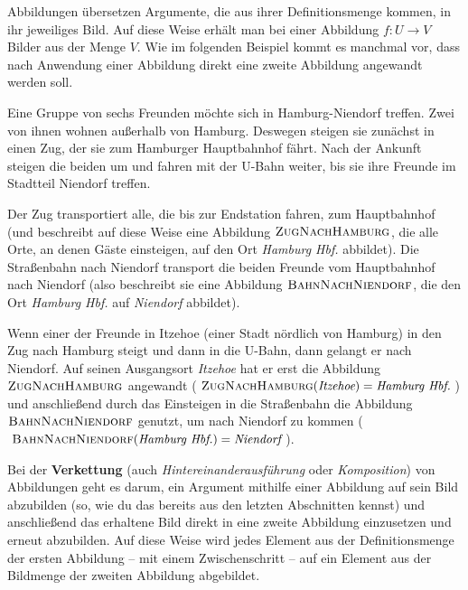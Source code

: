 \documentclass[../../main.tex]{subfiles}
\begin{document}
\label{sec:abbildungen_verkettung}

Abbildungen übersetzen Argumente, die aus ihrer Definitionsmenge kommen, in ihr jeweiliges Bild. Auf diese Weise erhält man bei einer Abbildung $f\colon U\rightarrow V$ Bilder aus der Menge $V$. Wie im folgenden Beispiel kommt es manchmal vor, dass nach Anwendung einer Abbildung direkt eine zweite Abbildung angewandt werden soll.

\begin{example}{}
    Eine Gruppe von sechs Freunden möchte sich in Hamburg-Niendorf treffen. Zwei von ihnen wohnen außerhalb von Hamburg. Deswegen steigen sie zunächst in einen Zug, der sie zum Hamburger Hauptbahnhof fährt. Nach der Ankunft steigen die beiden um und fahren mit der U-Bahn weiter, bis sie ihre Freunde im Stadtteil Niendorf treffen.
    
    Der Zug transportiert alle, die bis zur Endstation fahren, zum Hauptbahnhof (und beschreibt auf diese Weise eine Abbildung $\textsc{ZugNachHamburg}$, die alle Orte, an denen Gäste einsteigen, auf den Ort \emph{Hamburg Hbf.} abbildet). Die Straßenbahn nach Niendorf transport die beiden Freunde vom Hauptbahnhof nach Niendorf (also beschreibt sie eine Abbildung $\textsc{BahnNachNiendorf}$, die den Ort \emph{Hamburg Hbf.} auf \emph{Niendorf} abbildet).
    
    Wenn einer der Freunde in Itzehoe (einer Stadt nördlich von Hamburg) in den Zug nach Hamburg steigt und dann in die U-Bahn, dann gelangt er nach Niendorf. Auf seinen Ausgangsort \emph{Itzehoe} hat er erst die Abbildung $\textsc{ZugNachHamburg}$ angewandt ($\textsc{ZugNachHamburg}(\emph{Itzehoe})=\emph{Hamburg Hbf.}$) und anschließend durch das Einsteigen in die Straßenbahn die Abbildung $\textsc{BahnNachNiendorf}$ genutzt, um nach Niendorf zu kommen ($\textsc{BahnNachNiendorf}(\emph{Hamburg Hbf.})=\emph{Niendorf}$).
\end{example}

Bei der \textbf{Verkettung} (auch \emph{Hintereinanderausführung} oder \emph{Komposition}) von Abbildungen geht es darum, ein Argument mithilfe einer Abbildung auf sein Bild abzubilden (so, wie du das bereits aus den letzten Abschnitten kennst) und anschließend das erhaltene Bild direkt in eine zweite Abbildung einzusetzen und erneut abzubilden. Auf diese Weise wird jedes Element aus der Definitionsmenge der ersten Abbildung -- mit einem Zwischenschritt -- auf ein Element aus der Bildmenge der zweiten Abbildung abgebildet.
\end{document}

